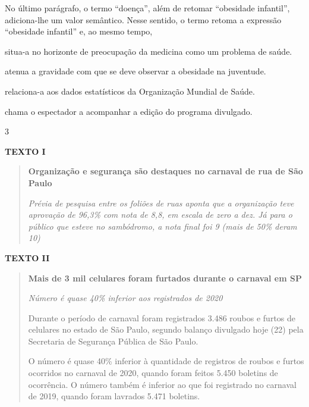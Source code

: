 
No último parágrafo, o termo ``doença'', além de retomar ``obesidade
infantil'', adiciona-lhe um valor semântico. Nesse sentido, o termo
retoma a expressão ``obesidade infantil'' e, ao mesmo tempo,

\begin{escolha}
\item situa-a no horizonte de preocupação da medicina como um problema de
saúde.

\item atenua a gravidade com que se deve observar a obesidade na juventude.

\item relaciona-a aos dados estatísticos da Organização Mundial de Saúde.

\item chama o espectador a acompanhar a edição do programa divulgado.
\end{escolha}

\num{3}

\textbf{TEXTO I}

\begin{quote}
\textbf{Organização e segurança são destaques no carnaval de rua de São
Paulo}

\emph{Prévia de pesquisa entre os foliões de ruas aponta que a
organização teve aprovação de 96,3\% com nota de 8,8, em escala de zero
a dez. Já para o público que esteve no sambódromo, a nota final foi 9
(mais de 50\% deram 10)}
\end{quote}


\textbf{TEXTO II}

\begin{quote}
\textbf{Mais de 3 mil celulares foram furtados durante o carnaval em SP}

\emph{Número é quase 40\% inferior aos registrados de 2020}

Durante o período de carnaval foram registrados 3.486 roubos e furtos de
celulares no estado de São Paulo, segundo balanço divulgado hoje (22)
pela Secretaria de Segurança Pública de São Paulo.

O número é quase 40\% inferior à quantidade de registros de roubos e
furtos ocorridos no carnaval de 2020, quando foram feitos 5.450 boletins
de ocorrência. O número também é inferior ao que foi registrado no
carnaval de 2019, quando foram lavrados 5.471 boletins.
\end{quote}

